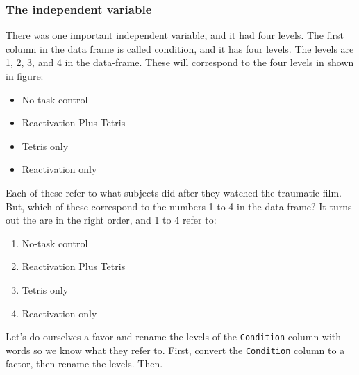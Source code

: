 \documentclass[]{book}
\newenvironment{Shaded}{\begin{snugshade}}{\end{snugshade}}
\newcommand{\KeywordTok}[1]{\textcolor[rgb]{0.13,0.29,0.53}{\textbf{{#1}}}}
\newcommand{\StringTok}[1]{\textcolor[rgb]{0.31,0.60,0.02}{{#1}}}
\newcommand{\NormalTok}[1]{{#1}}
\providecommand{\tightlist}{%
  \setlength{\itemsep}{0pt}\setlength{\parskip}{0pt}}
\theoremstyle{definition}
\theoremstyle{definition}
\theoremstyle{definition}
\theoremstyle{remark}
\begin{document}
\subsubsection{The independent variable}\label{the-independent-variable}

There was one important independent variable, and it had four levels.
The first column in the data frame is called condition, and it has four
levels. The levels are 1, 2, 3, and 4 in the data-frame. These will
correspond to the four levels in shown in figure:

\begin{itemize}
\tightlist
\item
  No-task control
\item
  Reactivation Plus Tetris
\item
  Tetris only
\item
  Reactivation only
\end{itemize}

Each of these refer to what subjects did after they watched the
traumatic film. But, which of these correspond to the numbers 1 to 4 in
the data-frame? It turns out the are in the right order, and 1 to 4
refer to:

\begin{enumerate}
\def\labelenumi{\arabic{enumi}.}
\tightlist
\item
  No-task control
\item
  Reactivation Plus Tetris
\item
  Tetris only
\item
  Reactivation only
\end{enumerate}

Let's do ourselves a favor and rename the levels of the
\texttt{Condition} column with words so we know what they refer to.
First, convert the \texttt{Condition} column to a factor, then rename
the levels. Then.

\begin{Shaded}
\end{Shaded}
\end{document}
